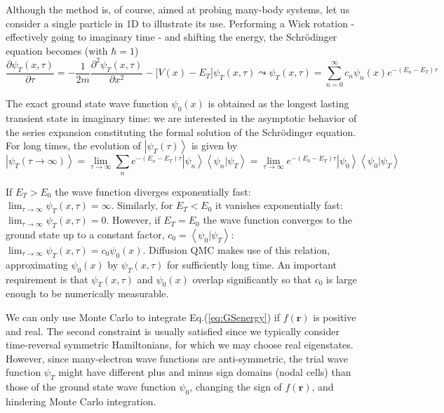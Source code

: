 Although the method is, of course, aimed at probing many-body systems, let us consider a single particle in \acs{1D} to illustrate its use.
Performing a Wick rotation - effectively going to imaginary time - and shifting the energy, the Schr\"odinger equation becomes (with $\hbar = 1$)
\begin{equation}
\frac{\partial \psi_T ( x, \tau )}{\partial\tau}  = -\frac{1}{2m}\frac{\partial^2 \psi_T ( x, \tau )}{\partial x^2} - \bigg[ V(x) - E_T \bigg] \psi_T( x, \tau )  \leadsto \psi_T (x, \tau) = \sum_{n=0}^{\infty} c_n \psi_n (x) e^{-(E_n - E_T)\tau}
\end{equation}

The exact ground state wave function $\psi_0 ( x )$ is obtained as the longest lasting transient state in imaginary time: we are interested in the asymptotic behavior of the series expansion constituting the formal solution of the Schr\"odinger equation.
For long times, the evolution of $\left| \psi_T (\tau) \right\rangle $ is given by
\begin{equation}\label{eq:im_ev}
\left| \psi_T (\tau \rightarrow \infty) \right\rangle = \lim_{\tau \rightarrow \infty} \sum_n e^{-(E_n - E_T) \tau} \left|\psi_n \right\rangle \left\langle \psi_n | \psi_T \right\rangle = \lim_{\tau \rightarrow \infty} e^{-(E_0 - E_T)\tau} \left| \psi_0 \right\rangle \left\langle \psi_0 | \psi_T \right\rangle 
\end{equation}

If $E_T > E_0$ the wave function diverges exponentially fast: $\lim_{\tau \rightarrow \infty} \psi_T ( x, \tau) = \infty$.
Similarly, for $E_T < E_0$ it vanishes exponentially fast: $\lim_{\tau \rightarrow \infty} \psi_T ( x, \tau) = 0$.
However, if $E_T = E_0$ the wave function converges to the ground state up to a constant factor, $c_0 = \left\langle \psi_0 | \psi_T \right\rangle$: 
$
\lim_{\tau \rightarrow \infty} \psi_T ( x, \tau) = c_0 \psi_0 (x)
$.
Diffusion \ac{QMC} makes use of this relation, approximating $\psi_0(x)$ by $\psi_T (x, \tau)$ for sufficiently long time.
An important requirement is that $\psi_T (x, \tau)$ and $\psi_0(x)$ overlap significantly so that $c_0$ is large enough to be numerically measurable.

We can only use Monte Carlo to integrate Eq.(\ref{eq:GSenergy}) if $f(\bm r)$ is positive and real.
The second constraint is usually satisfied since we typically consider time-reversal symmetric Hamiltonians, for which we may choose real eigenstates.
However, since many-electron wave functions are anti-symmetric, the trial wave function $\psi_T$ might have different plus and minus sign domains (nodal cells) than those of the ground state wave function $\psi_0$, changing the sign of $f ( \bm r )$, and hindering Monte Carlo integration.

